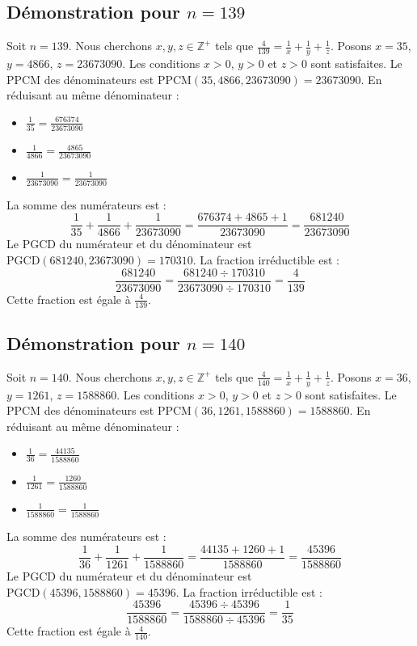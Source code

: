 \documentclass[11pt,a4paper]{article}
\begin{document}
\subsection{Démonstration pour $n = 139$}
Soit $n = 139$. Nous cherchons $x, y, z \in \mathbb{Z}^{+}$ tels que $\frac{4}{139} = \frac{1}{x} + \frac{1}{y} + \frac{1}{z}$.
Posons $x = 35$, $y = 4866$, $z = 23673090$.
Les conditions $x > 0$, $y > 0$ et $z > 0$ sont satisfaites.
Le PPCM des dénominateurs est $\text{PPCM}(35, 4866, 23673090) = 23673090$.
En réduisant au même dénominateur :
\begin{itemize}
    \item $\frac{1}{35} = \frac{676374}{23673090}$
    \item $\frac{1}{4866} = \frac{4865}{23673090}$
    \item $\frac{1}{23673090} = \frac{1}{23673090}$
\end{itemize}
La somme des numérateurs est :
$$ \frac{1}{35} + \frac{1}{4866} + \frac{1}{23673090} = \frac{676374 + 4865 + 1}{23673090} = \frac{681240}{23673090} $$
Le PGCD du numérateur et du dénominateur est $\text{PGCD}(681240, 23673090) = 170310$.
La fraction irréductible est :
$$ \frac{681240}{23673090} = \frac{681240 \div 170310}{23673090 \div 170310} = \frac{4}{139} $$
Cette fraction est égale à $\frac{4}{139}$.

\subsection{Démonstration pour $n = 140$}
Soit $n = 140$. Nous cherchons $x, y, z \in \mathbb{Z}^{+}$ tels que $\frac{4}{140} = \frac{1}{x} + \frac{1}{y} + \frac{1}{z}$.
Posons $x = 36$, $y = 1261$, $z = 1588860$.
Les conditions $x > 0$, $y > 0$ et $z > 0$ sont satisfaites.
Le PPCM des dénominateurs est $\text{PPCM}(36, 1261, 1588860) = 1588860$.
En réduisant au même dénominateur :
\begin{itemize}
    \item $\frac{1}{36} = \frac{44135}{1588860}$
    \item $\frac{1}{1261} = \frac{1260}{1588860}$
    \item $\frac{1}{1588860} = \frac{1}{1588860}$
\end{itemize}
La somme des numérateurs est :
$$ \frac{1}{36} + \frac{1}{1261} + \frac{1}{1588860} = \frac{44135 + 1260 + 1}{1588860} = \frac{45396}{1588860} $$
Le PGCD du numérateur et du dénominateur est $\text{PGCD}(45396, 1588860) = 45396$.
La fraction irréductible est :
$$ \frac{45396}{1588860} = \frac{45396 \div 45396}{1588860 \div 45396} = \frac{1}{35} $$
Cette fraction est égale à $\frac{4}{140}$.
\end{document}
